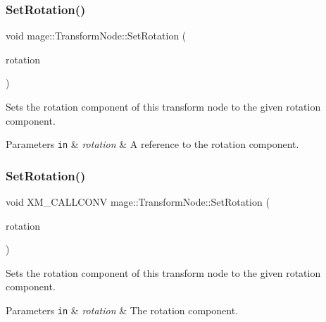 \subsubsection{\texorpdfstring{Set\+Rotation()}{SetRotation()}\hspace{0.1cm}{\footnotesize\ttfamily [3/4]}}
{\footnotesize\ttfamily void mage\+::\+Transform\+Node\+::\+Set\+Rotation (\begin{DoxyParamCaption}\item[{X\+M\+F\+L\+O\+A\+T3 \&\&}]{rotation }\end{DoxyParamCaption})\hspace{0.3cm}{\ttfamily [noexcept]}}

Sets the rotation component of this transform node to the given rotation component.


\begin{DoxyParams}[1]{Parameters}
\mbox{\tt in}  & {\em rotation} & A reference to the rotation component. \\
\hline
\end{DoxyParams}
\hypertarget{structmage_1_1_transform_node_a354d20ffedec33173a598718677f7a74}{}\label{structmage_1_1_transform_node_a354d20ffedec33173a598718677f7a74} 
\subsubsection{\texorpdfstring{Set\+Rotation()}{SetRotation()}\hspace{0.1cm}{\footnotesize\ttfamily [4/4]}}
{\footnotesize\ttfamily void X\+M\+\_\+\+C\+A\+L\+L\+C\+O\+NV mage\+::\+Transform\+Node\+::\+Set\+Rotation (\begin{DoxyParamCaption}\item[{F\+X\+M\+V\+E\+C\+T\+OR}]{rotation }\end{DoxyParamCaption})\hspace{0.3cm}{\ttfamily [noexcept]}}

Sets the rotation component of this transform node to the given rotation component.


\begin{DoxyParams}[1]{Parameters}
\mbox{\tt in}  & {\em rotation} & The rotation component. \\
\hline
\end{DoxyParams}
\hypertarget{structmage_1_1_transform_node_ac44727a692c1ef8d9e03e42526ac2b9d}{}\label{structmage_1_1_transform_node_ac44727a692c1ef8d9e03e42526ac2b9d} 
